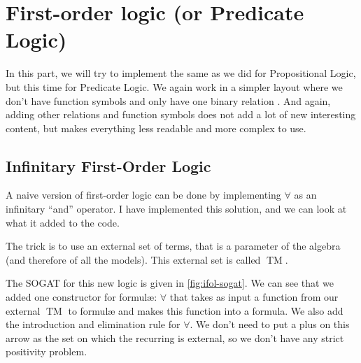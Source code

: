 \documentclass[10pt,a4paper]{article}
\begin{document}
	\section{First-order logic (or Predicate Logic)}
	
		In this part, we will try to implement the same as we did for Propositional Logic, but this time for Predicate Logic. We again work in a simpler layout where we don't have function symbols and only have one binary relation . And again, adding other relations and function symbols does not add a lot of new interesting content, but makes everything less readable and more complex to use.
		
		\subsection{Infinitary First-Order Logic}
		
			A naive version of first-order logic can be done by implementing $\forall$ as an infinitary \enquote{and} operator. I have implemented this solution, and we can look at what it added to the code.
		
			The trick is to use an external set of terms, that is a parameter of the algebra (and therefore of all the models). This external set is called $\operatorname{TM}$.
			
			The SOGAT for this new logic is given in \autoref{fig:ifol-sogat}. We can see that we added one constructor for formulæ: $\forall$ that takes as input a function from our external $\operatorname{TM}$ to formulæ and makes this function into a formula. We also add the introduction and elimination rule for $\forall$. We don't need to put a plus on this arrow as the set on which the recurring is external, so we don't have any strict positivity problem.
			
\end{document}
